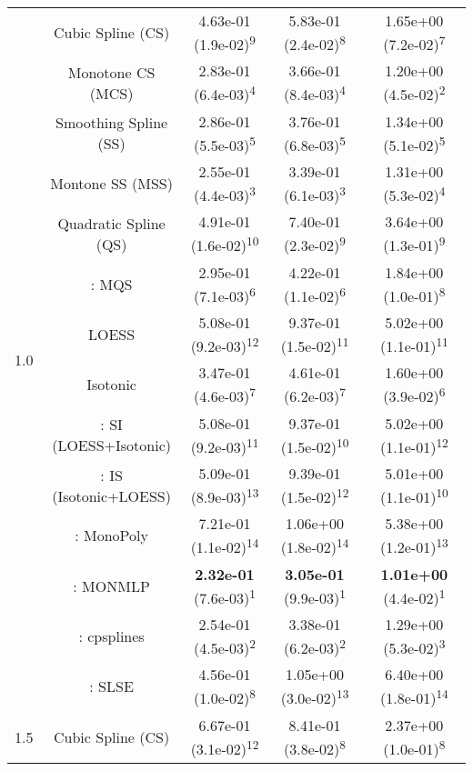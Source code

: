 \begin{tabular}{ccccc}
\midrule
\multirow{14}{*}{1.0}&Cubic Spline (CS)& 4.63e-01 (1.9e-02)\textsuperscript{9}& 5.83e-01 (2.4e-02)\textsuperscript{8}& 1.65e+00 (7.2e-02)\textsuperscript{7}\tabularnewline
&Monotone CS (MCS)& 2.83e-01 (6.4e-03)\textsuperscript{4}& 3.66e-01 (8.4e-03)\textsuperscript{4}& 1.20e+00 (4.5e-02)\textsuperscript{2}\tabularnewline
&Smoothing Spline (SS)& 2.86e-01 (5.5e-03)\textsuperscript{5}& 3.76e-01 (6.8e-03)\textsuperscript{5}& 1.34e+00 (5.1e-02)\textsuperscript{5}\tabularnewline
&Montone SS (MSS)& 2.55e-01 (4.4e-03)\textsuperscript{3}& 3.39e-01 (6.1e-03)\textsuperscript{3}& 1.31e+00 (5.3e-02)\textsuperscript{4}\tabularnewline
&Quadratic Spline (QS)& 4.91e-01 (1.6e-02)\textsuperscript{10}& 7.40e-01 (2.3e-02)\textsuperscript{9}& 3.64e+00 (1.3e-01)\textsuperscript{9}\tabularnewline
&\textcite{heMonotoneBsplineSmoothing1998}: MQS& 2.95e-01 (7.1e-03)\textsuperscript{6}& 4.22e-01 (1.1e-02)\textsuperscript{6}& 1.84e+00 (1.0e-01)\textsuperscript{8}\tabularnewline
&LOESS& 5.08e-01 (9.2e-03)\textsuperscript{12}& 9.37e-01 (1.5e-02)\textsuperscript{11}& 5.02e+00 (1.1e-01)\textsuperscript{11}\tabularnewline
&Isotonic& 3.47e-01 (4.6e-03)\textsuperscript{7}& 4.61e-01 (6.2e-03)\textsuperscript{7}& 1.60e+00 (3.9e-02)\textsuperscript{6}\tabularnewline
&\textcite{mammenEstimatingSmoothMonotone1991}: SI (LOESS+Isotonic)& 5.08e-01 (9.2e-03)\textsuperscript{11}& 9.37e-01 (1.5e-02)\textsuperscript{10}& 5.02e+00 (1.1e-01)\textsuperscript{12}\tabularnewline
&\textcite{mammenEstimatingSmoothMonotone1991}: IS (Isotonic+LOESS)& 5.09e-01 (8.9e-03)\textsuperscript{13}& 9.39e-01 (1.5e-02)\textsuperscript{12}& 5.01e+00 (1.1e-01)\textsuperscript{10}\tabularnewline
&\textcite{murrayFastFlexibleMethods2016a}: MonoPoly& 7.21e-01 (1.1e-02)\textsuperscript{14}& 1.06e+00 (1.8e-02)\textsuperscript{14}& 5.38e+00 (1.2e-01)\textsuperscript{13}\tabularnewline
&\textcite{cannonMonmlpMultilayerPerceptron2017}: MONMLP& \textbf{2.32e-01} (7.6e-03)\textsuperscript{1}& \textbf{3.05e-01} (9.9e-03)\textsuperscript{1}& \textbf{1.01e+00} (4.4e-02)\textsuperscript{1}\tabularnewline
&\textcite{navarro-garciaConstrainedSmoothingOutofrange2023}: cpsplines& 2.54e-01 (4.5e-03)\textsuperscript{2}& 3.38e-01 (6.2e-03)\textsuperscript{2}& 1.29e+00 (5.3e-02)\textsuperscript{3}\tabularnewline
&\textcite{groeneboomConfidenceIntervalsMonotone2023}: SLSE& 4.56e-01 (1.0e-02)\textsuperscript{8}& 1.05e+00 (3.0e-02)\textsuperscript{13}& 6.40e+00 (1.8e-01)\textsuperscript{14}\tabularnewline
\midrule
\multirow{14}{*}{1.5}&Cubic Spline (CS)& 6.67e-01 (3.1e-02)\textsuperscript{12}& 8.41e-01 (3.8e-02)\textsuperscript{8}& 2.37e+00 (1.0e-01)\textsuperscript{8}\tabularnewline

\end{tabular}
